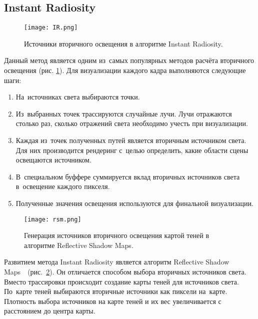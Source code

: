 \documentclass[12pt,fleqn]{article}
\begin{document}
\subsection{Instant Radiosity}

\begin{figure}[htb]
    \centering
    \texttt{[image: IR.png]}
    \caption{Источники вторичного освещения в алгоритме Instant Radiosity.}
    \label{IR}
\end{figure}

Данный метод \cite{InstantRadiosity} является одним из~самых популярных методов расчёта вторичного освещения (рис. \ref{IR}). Для визуализации каждого кадра выполняются следующие шаги:

\begin{enumerate}

\item На~источниках света выбираются точки.

\item Из~выбранных точек трассируются случайные лучи. Лучи отражаются столько раз, сколько отражений света необходимо учесть при визуализации.

\item Каждая из~точек полученных путей является вторичным источником света. Для них производится рендеринг с~целью определить, какие области сцены освещаются источником.

\item В~специальном буффере суммируется вклад вторичных источников света в~освещение каждого пикселя.

\item Полученные значения освещения используются для финальной визуализации.

\end{enumerate}

\begin{figure}[htb]
    \centering
    \texttt{[image: rsm.png]}
    \caption{Генерация источников вторичного освещения картой теней в алгоритме Reflective Shadow Maps.}
    \label{rsm}
\end{figure}

Развитием метода Instant Radiosity является алгоритм Reflective Shadow Maps~\cite{ReflectiveShadowMaps}~(рис.~\ref{rsm}). Он отличается способом выбора вторичных источников света. Вместо трассировки происходит создание карты теней \cite{ShadowMaps} для источников света. По~карте теней выбираются вторичные источники как пиксели на~карте. Плотность выбора источников на карте теней и их вес увеличивается с расстоянием до центра карты.
\end{document}
